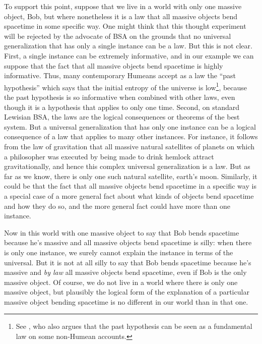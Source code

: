 To support this point, suppose that we live in a world with only one massive object, Bob, but where nonetheless it is a law that all massive objects
bend spacetime in some specific way. One might think that this thought experiment will be rejected by the advocate of BSA on the grounds that no 
universal generalization that has only a single instance can be a law. But this is not clear. First, a single instance can be
extremely informative, and in our example we can suppose that the fact that all massive objects bend spacetime is
highly informative. Thus, many contemporary Humeans accept as a law the ``past hypothesis'' which says that the initial entropy of the
universe is low\footnote{See , who also argues that the past hypothesis can be seen as a fundamental
law on some non-Humean accounts.}, because the past hypothesis is so informative when combined with other laws, even though it is a hypothesis that applies
to only one time. Second, on standard Lewisian BSA, the laws are the logical consequences or theorems of the best system. But a universal 
generalization that has only one instance can be a logical consequence of a law that applies to many other instances. For instance,
it follows from the law of gravitation that all massive natural satellites of planets on which a philosopher was executed by being
made to drink hemlock attract gravitationally, and hence this complex universal generalization is a law. But as far as we know, 
there is only one such natural satellite, earth's moon. Similarly, it could be that the fact that all massive objects bend spacetime in a specific way
is a special case of a more general fact about what kinds of objects bend spacetime and how they do so, and the more general fact could have
more than one instance. 

Now in this world with one massive object to say that Bob bends spacetime because he's massive and all massive objects bend spacetime 
is silly: when there is only one instance, we surely cannot explain the instance in terms of the universal.
But it is not at all silly to say that Bob bends spacetime because he's massive and \textit{by law} all massive objects bend
spacetime,  even if Bob is the only massive object. Of course, we do not live in a world where there is only one massive object, but plausibly the logical form of the explanation of a particular massive object bending spacetime is no different in 
our world than in that one.

